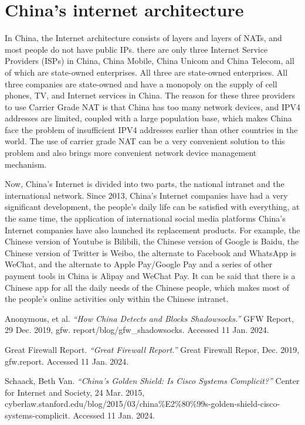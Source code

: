 \documentclass[11pt]{article}
\begin{document}
\section{China's internet architecture}
In China, the Internet architecture consists of layers and layers of NATs, and
most people do not have public IPs. there are only three Internet Service
Providers (ISPs) in China, China Mobile, China Unicom and China Telecom, all of
which are state-owned enterprises. All three are state-owned enterprises. All
three companies are state-owned and have a monopoly on the supply of cell phones,
TV, and Internet services in China. The reason for these three providers to use
Carrier Grade NAT is that China has too many network devices, and IPV4 addresses
are limited, coupled with a large population base, which makes China face the
problem of insufficient IPV4 addresses earlier than other countries in the world.
The use of carrier grade NAT can be a very convenient solution to this problem
and also brings more convenient network device management mechanism.

Now, China's Internet is divided into two parts, the national intranet and the
international network. Since 2013, China's Internet companies have had a very
significant development, the people's daily life can be satisfied with
everything, at the same time, the application of international social media
platforms China's Internet companies have also launched its replacement products.
For example, the Chinese version of Youtube is Bilibili, the Chinese version of
Google is Baidu, the Chinese version of Twitter is Weibo, the alternate to
Facebook and WhatsApp is WeChat, and the alternate to Apple Pay/Google Pay and a
series of other payment tools in China is Alipay and WeChat Pay. It can be said
that there is a Chinese app for all the daily needs of the Chinese people, which
makes most of the people's online activities only within the Chinese intranet.

\newpage

\begin{thebibliography}{9}
	 Anonymous, et al. \textit{``How China Detects
		and Blocks Shadowsocks.''} GFW Report, 29 Dec. 2019, gfw.
	report/blog/gfw\_shadowsocks. Accessed 11 Jan. 2024.

	 Great Firewall Report. \textit{``Great Firewall Report.''}
	Great Firewall Repor, Dec. 2019, gfw.report. Accessed 11 Jan. 2024.

	Schaack, Beth Van. \textit{``China's Golden Shield: Is Cisco Systems Complicit?''} Center
	for Internet and Society, 24 Mar. 2015, cyberlaw.stanford.edu/blog/2015/03/china\%E2\%80\%99s-golden-shield-cisco-systems-complicit.
	Accessed 11 Jan. 2024.

\end{thebibliography}
\end{document}
